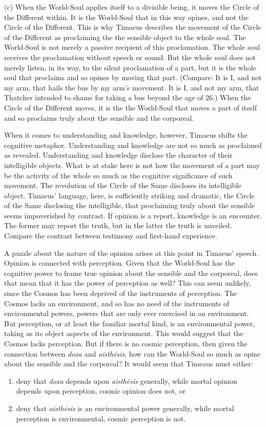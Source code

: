 (c) When the World-Soul applies itself to a divisible being, it moves the Circle of the Different within. It is the World-Soul that in this way opines, and not the Circle of the Different. This is why Timaeus describes the movement of the Circle of the Different as proclaiming the the sensible object to the whole soul. The World-Soul is not merely a passive recipient of this proclamation. The whole soul receives the proclamation without speech or sound. But the whole soul does not merely listen, in its way, to the silent proclamation of a part, but it is the whole soul that proclaims and so opines by moving that part. (Compare: It is I, and not my arm, that hails the bus by my arm's movement. It is I, and not my arm, that Thatcher intended to shame for taking a bus beyond the age of 26.) When the Circle of the Different moves, it is the the World-Soul that moves a part of itself and so proclaims truly about the sensible and the corporeal. 

When it comes to understanding and knowledge, however, Timaeus shifts the cognitive metaphor. Understanding and knowledge are not so much as proclaimed as revealed. Understanding and knowledge disclose the character of their intelligible objects. What is at stake here is not how the movement of a part may be the activity of the whole so much as the cognitive significance of such movement. The revolution of the Circle of the Same discloses its intelligible object. Timaeus' language, here, is sufficiently striking and dramatic, the Circle of the Same disclosing the intelligible, that proclaiming truly about the sensible seems impoverished by contrast. If opinion is a report, knowledge is an encounter. The former may report the truth, but in the latter the truth is unveiled. Compare the contrast between testimony and first-hand experience. 

A puzzle about the nature of the opinion arises at this point in Timaeus' speech. Opinion is connected with perception. Given that the World-Soul has the cognitive power to frame true opinion about the sensible and the corporeal, does that mean that it has the power of perception as well? This can seem unlikely, since the Cosmos has been deprived of the instruments of perception. The Cosmos lacks an environment, and so has no need of the instruments of environmental powers, powers that are only ever exercised in an environment. But perception, or at least the familiar mortal kind, is an environmental power, taking as its object aspects of the environment. This would suggest that the Cosmos lacks perception. But if there is no cosmic perception, then given the connection between \emph{doxa} and \emph{aisthēsis}, how can the World-Soul so much as opine about the sensible and the corporeal? It would seem that Timeaus must either:
\begin{enumerate}[(1)]
	\item deny that \emph{doxa} depends upon \emph{aisthēsis} generally, while mortal opinion depends upon perception, cosmic opinion does not, or
	\item deny that \emph{aisthēsis} is an environmental power generally, while mortal perception is environmental, cosmic perception is not. 
\end{enumerate}

